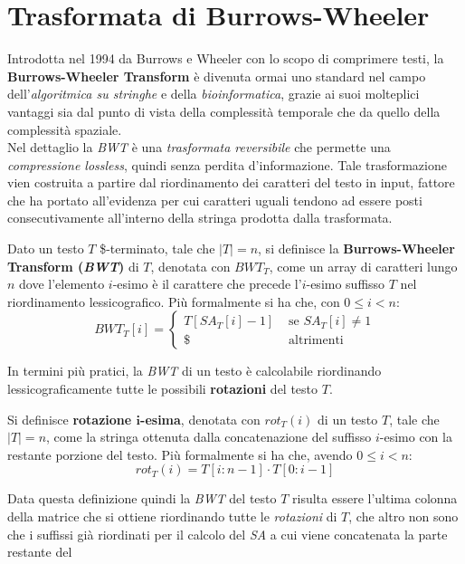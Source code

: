 \section{Trasformata di Burrows-Wheeler}
\label{secbwt}
Introdotta nel 1994 da Burrows e Wheeler con lo scopo di comprimere testi, la
\textbf{Burrows-Wheeler Transform} \cite{bwt} è divenuta ormai uno standard nel
campo dell'\textit{algoritmica su stringhe} e della \textit{bioinformatica},
grazie ai suoi molteplici vantaggi sia dal punto di vista della complessità
temporale che da quello della complessità spaziale.\\
Nel dettaglio la \textit{BWT} è una \textit{trasformata reversibile} che
permette una \textit{compressione lossless}, quindi senza perdita
d'informazione. Tale trasformazione vien costruita a partire dal riordinamento
dei caratteri del testo in input, fattore che ha 
portato all'evidenza per cui caratteri uguali tendono ad essere posti
consecutivamente all'interno della stringa prodotta dalla trasformata.
\begin{definizione}
  Dato un testo $T$ \$-terminato, tale che $|T|=n$, si definisce la
  \textbf{Burrows-Wheeler Transform (\textit{BWT})} di $T$, denotata con
  $BWT_T$, come un array di caratteri lungo $n$ dove l'elemento $i$-esimo è il
  carattere che precede l'$i$-esimo suffisso $T$ nel riordinamento
  lessicografico. Più formalmente si ha che, con $0\leq i<n$:
  \[BWT_T[i]=
    \begin{cases}
      T[SA_T[i]-1]&\mbox{ se } SA_T[i]\neq 1\\
      \$&\mbox{ altrimenti}
    \end{cases}
  \]
\end{definizione}
In termini più pratici, la \textit{BWT} di un testo è calcolabile riordinando
lessicograficamente tutte le possibili \textbf{rotazioni} del testo $T$.
\begin{definizione}
  Si definisce \textbf{rotazione $\mathbf{i}$-esima}, denotata con $rot_T(i)$ di
  un testo $T$, tale che $|T|=n$, come la stringa ottenuta dalla concatenazione
  del suffisso $i$-esimo con la restante porzione del testo. Più formalmente si
  ha che, avendo $0\leq i<n$:
  \[rot_T(i)=T[i:n-1]\cdot T[0:i-1]\]
\end{definizione}
Data questa definizione quindi la \textit{BWT} del testo $T$ risulta essere
l'ultima colonna della matrice che si ottiene riordinando tutte le
\textit{rotazioni} di $T$, che altro non sono che i suffissi già riordinati per
il calcolo del \textit{SA} a cui viene concatenata la parte restante del

